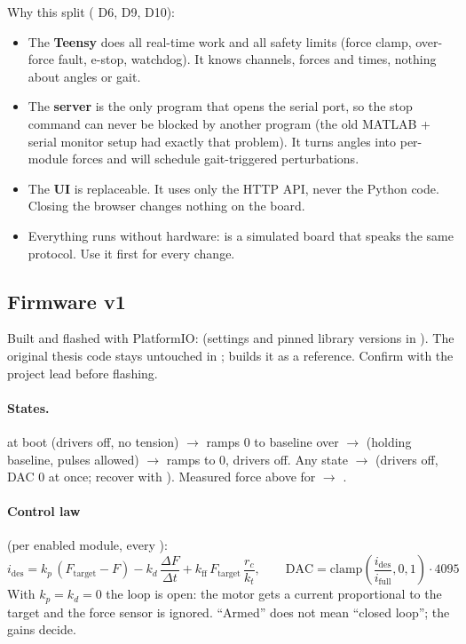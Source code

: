 Why this split ( D6, D9, D10):
\begin{itemize}
\item The \textbf{Teensy} does all real-time work and all safety limits (force clamp, over-force fault,
e-stop, watchdog). It knows channels, forces and times, nothing about angles or gait.
\item The \textbf{server} is the only program that opens the serial port, so the stop command can never be
blocked by another program (the old MATLAB + serial monitor setup had exactly that problem). It turns
angles into per-module forces and will schedule gait-triggered perturbations.
\item The \textbf{UI} is replaceable. It uses only the HTTP API, never the Python code. Closing the browser
changes nothing on the board.
\item Everything runs without hardware:  is a simulated board that speaks the same
protocol. Use it first for every change.
\end{itemize}

\subsection{Firmware v1}\label{sec:firmware}
Built and flashed with PlatformIO:  (settings and pinned library versions in
). The original thesis code stays untouched in ;
  builds it as a reference. Confirm with the project lead before flashing.

\paragraph{States.}  at boot (drivers off, no tension) $\rightarrow$  ramps 0 to
baseline over  $\rightarrow$  (holding baseline, pulses allowed) $\rightarrow$
 ramps to 0, drivers off. Any state $\rightarrow$  (drivers off, DAC 0 at once;
recover with ). Measured force above  for  $\rightarrow$ .

\paragraph{Control law} (per enabled module, every ):
\[
i_\mathrm{des} = k_p\,(F_\mathrm{target}-F) - k_d\,\frac{\Delta F}{\Delta t}
  + k_\mathrm{ff}\,F_\mathrm{target}\,\frac{r_c}{k_t},\qquad
\mathrm{DAC} = \mathrm{clamp}\!\left(\frac{i_\mathrm{des}}{i_\mathrm{full}},0,1\right)\cdot 4095
\]
With $k_p = k_d = 0$ the loop is open: the motor gets a current proportional to the target and the force
sensor is ignored. ``Armed'' does not mean ``closed loop''; the gains decide.

